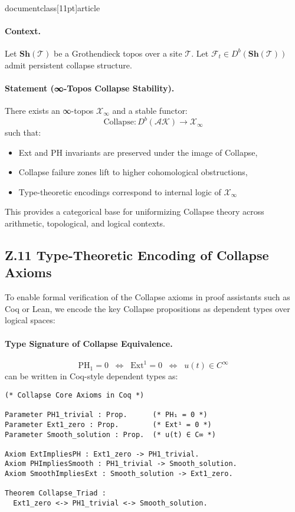 \\documentclass[11pt]{article}
\begin{document}
\paragraph{Context.}
Let \( \mathbf{Sh}(\mathcal{T}) \) be a Grothendieck topos over a site \( \mathcal{T} \).  
Let \( \mathcal{F}_t \in D^b(\mathbf{Sh}(\mathcal{T})) \) admit persistent collapse structure.

\paragraph{Statement (∞-Topos Collapse Stability).}
There exists an ∞-topos \( \mathcal{X}_\infty \) and a stable functor:
\[
\text{Collapse} : D^b(\mathcal{AK}) \longrightarrow \mathcal{X}_\infty
\]
such that:
\begin{itemize}
  \item Ext and PH invariants are preserved under the image of Collapse,
  \item Collapse failure zones lift to higher cohomological obstructions,
  \item Type-theoretic encodings correspond to internal logic of \( \mathcal{X}_\infty \)
\end{itemize}

This provides a categorical base for uniformizing Collapse theory across arithmetic, topological, and logical contexts.

\subsection*{Z.11 Type-Theoretic Encoding of Collapse Axioms}

To enable formal verification of the Collapse axioms in proof assistants such as Coq or Lean,  
we encode the key Collapse propositions as dependent types over logical spaces:

\paragraph{Type Signature of Collapse Equivalence.}
\[
\mathrm{PH}_1 = 0 \;\; \Leftrightarrow \;\; \mathrm{Ext}^1 = 0 \;\; \Leftrightarrow \;\; u(t) \in C^\infty
\]
can be written in Coq-style dependent types as:

\begin{lstlisting}[language=Coq, caption=Collapse Structure Encoding in Coq]
(* Collapse Core Axioms in Coq *)

Parameter PH1_trivial : Prop.      (* PH₁ = 0 *)
Parameter Ext1_zero : Prop.        (* Ext¹ = 0 *)
Parameter Smooth_solution : Prop.  (* u(t) ∈ C∞ *)

Axiom ExtImpliesPH : Ext1_zero -> PH1_trivial.
Axiom PHImpliesSmooth : PH1_trivial -> Smooth_solution.
Axiom SmoothImpliesExt : Smooth_solution -> Ext1_zero.

Theorem Collapse_Triad :
  Ext1_zero <-> PH1_trivial <-> Smooth_solution.
\end{lstlisting}
\end{document}
